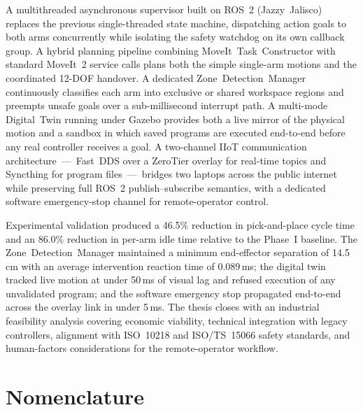 \documentclass[11pt,a4paper,twoside]{report}
\begin{document}
\setlength{\parskip}{1em}
A multithreaded asynchronous supervisor built on ROS~2 (Jazzy~Jalisco) replaces the previous single-threaded state machine, dispatching action goals to both arms concurrently while isolating the safety watchdog on its own callback group. A hybrid planning pipeline combining MoveIt~Task~Constructor with standard MoveIt~2 service calls plans both the simple single-arm motions and the coordinated 12-DOF handover. A dedicated Zone~Detection~Manager continuously classifies each arm into exclusive or shared workspace regions and preempts unsafe goals over a sub-millisecond interrupt path. A multi-mode Digital~Twin running under Gazebo provides both a live mirror of the physical motion and a sandbox in which saved programs are executed end-to-end before any real controller receives a goal. A two-channel IIoT communication architecture~—~Fast~DDS over a ZeroTier overlay for real-time topics and Syncthing for program files~—~bridges two laptops across the public internet while preserving full ROS~2 publish--subscribe semantics, with a dedicated software emergency-stop channel for remote-operator control.

\setlength{\parskip}{1em}
Experimental validation produced a 46.5\% reduction in pick-and-place cycle time and an 86.0\% reduction in per-arm idle time relative to the Phase~I baseline. The Zone~Detection~Manager maintained a minimum end-effector separation of 14.5\,cm with an average intervention reaction time of 0.089\,ms; the digital twin tracked live motion at under 50\,ms of visual lag and refused execution of any unvalidated program; and the software emergency stop propagated end-to-end across the overlay link in under 5\,ms. The thesis closes with an industrial feasibility analysis covering economic viability, technical integration with legacy controllers, alignment with ISO~10218 and ISO/TS~15066 safety standards, and human-factors considerations for the remote-operator workflow.
\clearpage

\begingroup
\makeatletter
\let\ps@plain\ps@fancy %
\tableofcontents
\listoffigures
\makeatother
\endgroup
\clearpage

\listoftables
\thispagestyle{fancy}
\clearpage

\chapter*{Nomenclature}
\thispagestyle{fancy}
\end{document}
